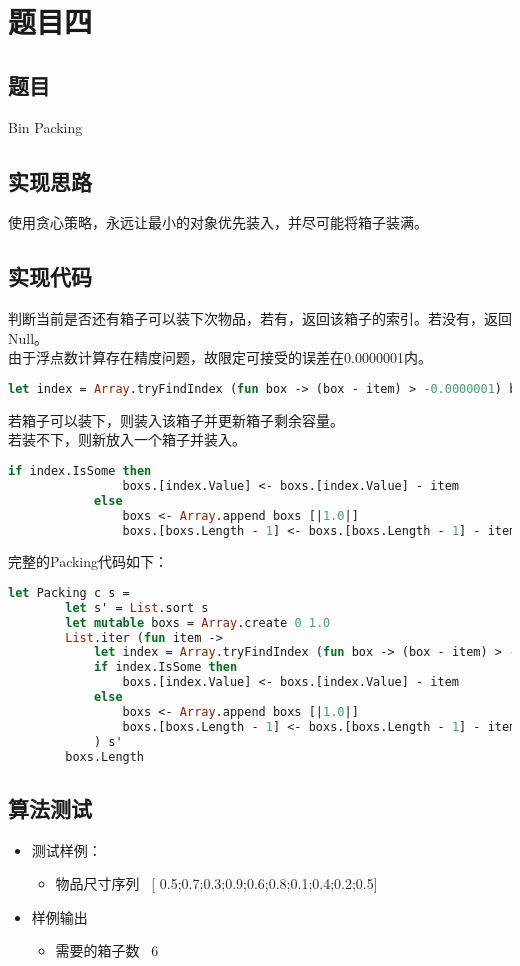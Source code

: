 \documentclass[a4paper]{article}
\begin{document}
\section{题目四}

\subsection{题目}

Bin Packing

\subsection{实现思路}

使用贪心策略，永远让最小的对象优先装入，并尽可能将箱子装满。

\subsection{实现代码}

判断当前是否还有箱子可以装下次物品，若有，返回该箱子的索引。若没有，返回Null。\\
由于浮点数计算存在精度问题，故限定可接受的误差在0.0000001内。

\begin{lstlisting}[language=ML]
            let index = Array.tryFindIndex (fun box -> (box - item) > -0.0000001) boxs
\end{lstlisting}

若箱子可以装下，则装入该箱子并更新箱子剩余容量。\\
若装不下，则新放入一个箱子并装入。

\begin{lstlisting}[language=ML]
            if index.IsSome then
                boxs.[index.Value] <- boxs.[index.Value] - item
            else
                boxs <- Array.append boxs [|1.0|]
                boxs.[boxs.Length - 1] <- boxs.[boxs.Length - 1] - item
\end{lstlisting}

完整的Packing代码如下：

\begin{lstlisting}[language=ML]
    let Packing c s =
        let s' = List.sort s
        let mutable boxs = Array.create 0 1.0
        List.iter (fun item -> 
            let index = Array.tryFindIndex (fun box -> (box - item) > -0.0000001) boxs
            if index.IsSome then
                boxs.[index.Value] <- boxs.[index.Value] - item
            else
                boxs <- Array.append boxs [|1.0|]
                boxs.[boxs.Length - 1] <- boxs.[boxs.Length - 1] - item
            ) s'
        boxs.Length
\end{lstlisting}

\subsection{算法测试}

\begin{itemize}
\item
    测试样例：
    \begin{itemize}
    \item
        物品尺寸序列 \ [ 0.5;0.7;0.3;0.9;0.6;0.8;0.1;0.4;0.2;0.5] 
    \end{itemize}
\item
    样例输出
    \begin{itemize}
    \item
        需要的箱子数 \ 6
    \end{itemize}
\end{itemize}
\end{document}
